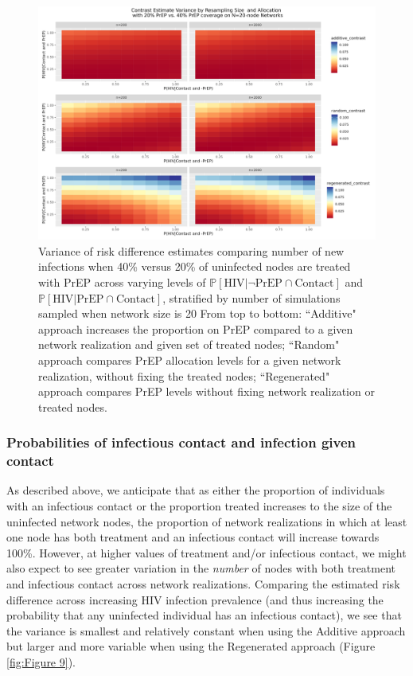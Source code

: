 \documentclass{article}
\theoremstyle{definition}
\begin{document}
\begin{figure}[H]
    \centering
    \includegraphics[width=\linewidth]{Corrected Figures/Resampling Size Variance Plot.png}
    \caption{Variance of risk difference estimates comparing number of new infections when 40\% versus 20\% of uninfected nodes are treated with PrEP across varying levels of $\mathbb{P}\left[\text{HIV} \vert \neg \text{PrEP} \cap \text{Contact}\right]$ and $\mathbb{P}\left[\text{HIV} \vert \text{PrEP} \cap \text{Contact}\right]$, stratified by number of simulations sampled when network size is 20 %
    From top to bottom: ``Additive" approach increases the proportion on PrEP compared to a given network realization and given set of treated nodes; ``Random" approach compares PrEP allocation levels for a given network realization, without fixing the treated nodes; ``Regenerated" approach compares PrEP levels without fixing network realization or treated nodes. }
    \label{fig:Figure 8}
\end{figure}

\subsubsection{Probabilities of infectious contact and infection given contact}
As described above, we anticipate that as either the proportion of individuals with an infectious contact or the proportion treated increases to the size of the uninfected network nodes, the proportion of network realizations in which at least one node has both treatment and an infectious contact will increase towards 100\%. However, at higher values of treatment and/or infectious contact, we might also expect to see greater variation in the \textit{number} of nodes with both treatment and infectious contact across network realizations. Comparing the estimated risk difference across increasing HIV infection prevalence (and thus increasing the probability that any uninfected individual has an infectious contact), we see that the variance is smallest and relatively constant when using the Additive approach but larger and more variable when using the Regenerated approach (Figure \ref{fig:Figure 9}).
\end{document}
